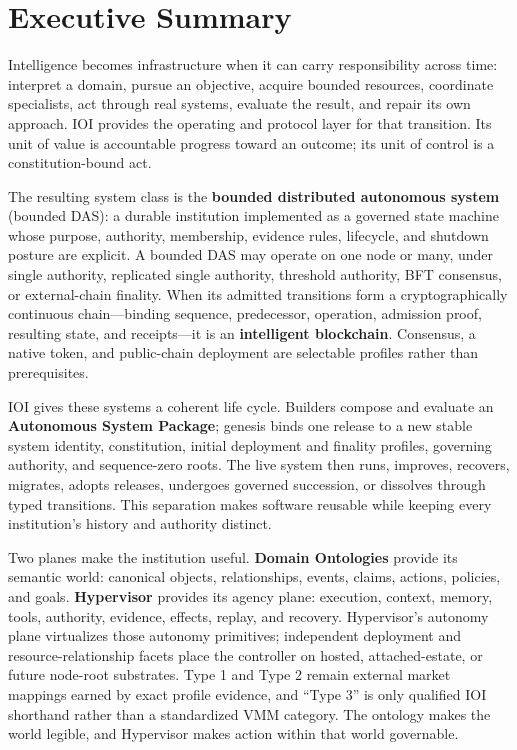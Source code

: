 \documentclass[
  11pt,
]{article}
\begin{document}
\hypertarget{executive-summary}{%
\section{Executive Summary}\label{executive-summary}}

Intelligence becomes infrastructure when it can carry responsibility across
time: interpret a domain, pursue an objective, acquire bounded resources,
coordinate specialists, act through real systems, evaluate the result, and
repair its own approach. IOI provides the operating and protocol layer for
that transition. Its unit of value is accountable progress toward an outcome;
its unit of control is a constitution-bound act.

The resulting system class is the \textbf{bounded distributed autonomous
system} (bounded DAS): a durable institution implemented as a governed state
machine whose purpose, authority, membership, evidence rules, lifecycle, and
shutdown posture are explicit. A bounded DAS may operate on one node or many,
under single authority, replicated single authority, threshold authority, BFT
consensus, or external-chain finality. When its admitted transitions form a
cryptographically continuous chain---binding sequence, predecessor,
operation, admission proof, resulting state, and receipts---it is an
\textbf{intelligent blockchain}. Consensus, a native token, and public-chain
deployment are selectable profiles rather than prerequisites.

IOI gives these systems a coherent life cycle. Builders compose and evaluate
an \textbf{Autonomous System Package}; genesis binds one release to a new
stable system identity, constitution, initial deployment and finality
profiles, governing authority, and sequence-zero roots. The live system then
runs, improves, recovers, migrates, adopts releases, undergoes governed
succession, or dissolves through typed transitions. This separation makes software
reusable while keeping every institution's history and authority distinct.

Two planes make the institution useful. \textbf{Domain Ontologies}
provide its semantic world: canonical objects, relationships, events, claims,
actions, policies, and goals. \textbf{Hypervisor} provides its agency plane:
execution, context, memory, tools, authority, evidence, effects, replay, and
recovery. Hypervisor's autonomy plane virtualizes those autonomy primitives;
independent deployment and resource-relationship facets place the controller
on hosted, attached-estate, or future node-root substrates. Type 1 and Type 2
remain external market mappings earned by exact profile evidence, and ``Type
3'' is only qualified IOI shorthand rather than a standardized VMM category.
The ontology makes the
world legible, and Hypervisor makes action within that world governable.
\end{document}
